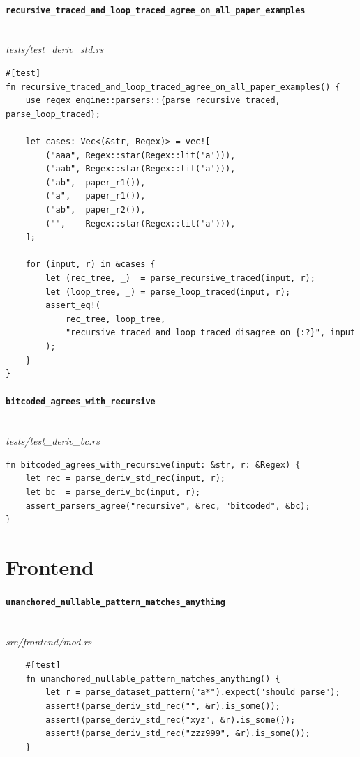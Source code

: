 \paragraph{\texttt{recursive\_traced\_and\_loop\_traced\_agree\_on\_all\_paper\_examples}}\ \\[-0.4em]
\textit{\small tests/test\_deriv\_std.rs}
{\scriptsize\begin{verbatim}
#[test]
fn recursive_traced_and_loop_traced_agree_on_all_paper_examples() {
    use regex_engine::parsers::{parse_recursive_traced, parse_loop_traced};

    let cases: Vec<(&str, Regex)> = vec![
        ("aaa", Regex::star(Regex::lit('a'))),
        ("aab", Regex::star(Regex::lit('a'))),
        ("ab",  paper_r1()),
        ("a",   paper_r1()),
        ("ab",  paper_r2()),
        ("",    Regex::star(Regex::lit('a'))),
    ];

    for (input, r) in &cases {
        let (rec_tree, _)  = parse_recursive_traced(input, r);
        let (loop_tree, _) = parse_loop_traced(input, r);
        assert_eq!(
            rec_tree, loop_tree,
            "recursive_traced and loop_traced disagree on {:?}", input
        );
    }
}
\end{verbatim}}

\paragraph{\texttt{bitcoded\_agrees\_with\_recursive}}\ \\[-0.4em]
\textit{\small tests/test\_deriv\_bc.rs}
{\scriptsize\begin{verbatim}
fn bitcoded_agrees_with_recursive(input: &str, r: &Regex) {
    let rec = parse_deriv_std_rec(input, r);
    let bc  = parse_deriv_bc(input, r);
    assert_parsers_agree("recursive", &rec, "bitcoded", &bc);
}
\end{verbatim}}

\section{Frontend}
\label{app:tests-frontend}

\paragraph{\texttt{unanchored\_nullable\_pattern\_matches\_anything}}\ \\[-0.4em]
\textit{\small src/frontend/mod.rs}
{\scriptsize\begin{verbatim}
    #[test]
    fn unanchored_nullable_pattern_matches_anything() {
        let r = parse_dataset_pattern("a*").expect("should parse");
        assert!(parse_deriv_std_rec("", &r).is_some());
        assert!(parse_deriv_std_rec("xyz", &r).is_some());
        assert!(parse_deriv_std_rec("zzz999", &r).is_some());
    }
\end{verbatim}}

